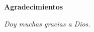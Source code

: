 \cleardoublepage

\begin{center}
\Huge{\textbf{Agradecimientos}}
\end{center}

\null
\vfill
\thispagestyle{empty}

{\normalsize \it \hfill Doy muchas gracias a Dios. 
\vspace*{4pt}}

\newpage
{} %


